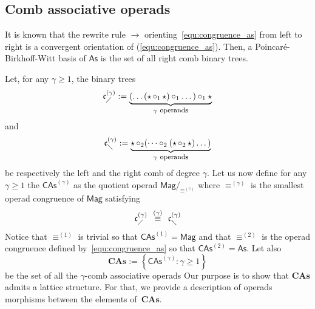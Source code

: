 \documentclass[10pt,reqno]{amsart}
\numberwithin{equation}{subsection}
\renewcommand{\geq}{\geqslant}
\newcommand{\Mag}{\mathsf{Mag}}
\newcommand{\As}{\mathsf{As}}
\newcommand{\CAs}[1]{\mathsf{CAs}^{(#1)}}
\newcommand{\CAsAll}{\mathbf{CAs}}
\newcommand{\LComb}[1]{\mathfrak{c}^{(#1)}_{\diagup}}
\newcommand{\RComb}[1]{\mathfrak{c}^{(#1)}_{\diagdown}}
\DeclareMathOperator{\Product}{\star}
\DeclareMathOperator{\Congr}{\equiv}
\DeclareMathOperator{\Rew}{\to}
\newcommand{\CongrCAs}[1]{\Congr^{(#1)}}
\begin{document}
\subsection{Comb associative operads}

It is known that the rewrite rule $\Rew$
orienting~\eqref{equ:congruence_as} from left to right is a convergent
orientation of (\ref{equ:congruence_as}). Then, a Poincaré-Birkhoff-Witt
basis of $\As$ is the set of all right comb binary trees.
\medbreak

Let, for any $\gamma \geq 1$, the binary trees
\begin{equation}
    \LComb{\gamma} :=
    \underbrace{(\dots (\Product \circ_1 \Product) \circ_1 \dots)
        \circ_1 \Product}
    _{\gamma \mbox{ \footnotesize operands}}
\end{equation}
and
\begin{equation}
    \RComb{\gamma} :=
    \underbrace{\Product \circ_2
        (\dots \circ_2 (\Product \circ_2 \Product) \dots)}
    _{\gamma \mbox{ \footnotesize operands}}
\end{equation}
be respectively the left and the right comb of degree $\gamma$.
Let us now define for any $\gamma \geq 1$ the  $\CAs{\gamma}$ as the quotient operad
$\Mag/_{\CongrCAs{\gamma}}$ where $\CongrCAs{\gamma}$ is the smallest
operad congruence of $\Mag$ satisfying
\begin{equation} \label{equ:congruence_CAs_gamma}
    \LComb{\gamma} \enspace \CongrCAs{\gamma} \enspace \RComb{\gamma}
\end{equation}
Notice that $\CongrCAs{1}$ is trivial so that
$\CAs{1} = \Mag$ and that $\CongrCAs{2}$ is the operad congruence
defined by~\eqref{equ:congruence_as} so that $\CAs{2} = \As$.
Let also
\begin{equation}
    \CAsAll := \left\{\CAs{\gamma} : \gamma\geq 1\right\}
\end{equation}
be the set of all the $\gamma$-comb associative operads
Our purpose is to show that $\CAsAll$ admits a lattice structure. For
that, we provide a description of operads morphisms between the
elements of~$\CAsAll$.
\medbreak

\end{document}
